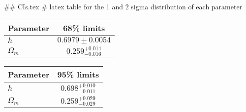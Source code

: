 ## CIs.tex
# latex table for the 1 and 2 sigma distribution of each parameter

\begin{tabular} { l  c}
 Parameter &  68\% limits\\
\hline
{\boldmath$h              $} & $0.6979\pm 0.0054          $\\
{\boldmath$\Omega_m       $} & $0.259^{+0.014}_{-0.016}   $\\
\hline
\end{tabular}

\begin{tabular} { l  c}
 Parameter &  95\% limits\\
\hline
{\boldmath$h              $} & $0.698^{+0.010}_{-0.011}   $\\
{\boldmath$\Omega_m       $} & $0.259^{+0.029}_{-0.029}   $\\
\hline
\end{tabular}
